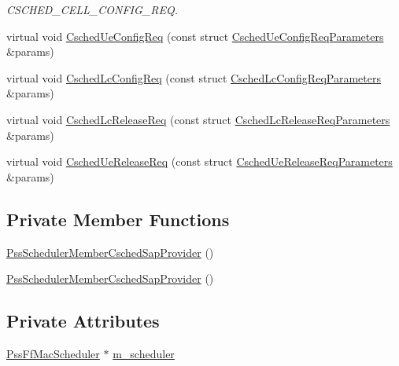 \begin{DoxyCompactItemize}
\begin{DoxyCompactList}\small\item\em C\+S\+C\+H\+E\+D\+\_\+\+C\+E\+L\+L\+\_\+\+C\+O\+N\+F\+I\+G\+\_\+\+R\+EQ. \end{DoxyCompactList}\item 
virtual void \hyperlink{classns3_1_1PssSchedulerMemberCschedSapProvider_a53a39ce3b42dffef27469d36454f8dfb}{Csched\+Ue\+Config\+Req} (const struct \hyperlink{structns3_1_1FfMacCschedSapProvider_1_1CschedUeConfigReqParameters}{Csched\+Ue\+Config\+Req\+Parameters} \&params)
\item 
virtual void \hyperlink{classns3_1_1PssSchedulerMemberCschedSapProvider_a5defa6a4e0f91494c09437b7ed276e87}{Csched\+Lc\+Config\+Req} (const struct \hyperlink{structns3_1_1FfMacCschedSapProvider_1_1CschedLcConfigReqParameters}{Csched\+Lc\+Config\+Req\+Parameters} \&params)
\item 
virtual void \hyperlink{classns3_1_1PssSchedulerMemberCschedSapProvider_a3a6b08c78c723482de224b869fb8c6e8}{Csched\+Lc\+Release\+Req} (const struct \hyperlink{structns3_1_1FfMacCschedSapProvider_1_1CschedLcReleaseReqParameters}{Csched\+Lc\+Release\+Req\+Parameters} \&params)
\item 
virtual void \hyperlink{classns3_1_1PssSchedulerMemberCschedSapProvider_aaef57062662f3d89227ab8a249e3a594}{Csched\+Ue\+Release\+Req} (const struct \hyperlink{structns3_1_1FfMacCschedSapProvider_1_1CschedUeReleaseReqParameters}{Csched\+Ue\+Release\+Req\+Parameters} \&params)
\end{DoxyCompactItemize}
\subsection*{Private Member Functions}
\begin{DoxyCompactItemize}
\item 
\hyperlink{classns3_1_1PssSchedulerMemberCschedSapProvider_ae9f5680c397e275f3700ff9fb5dc9312}{Pss\+Scheduler\+Member\+Csched\+Sap\+Provider} ()
\item 
\hyperlink{classns3_1_1PssSchedulerMemberCschedSapProvider_ae9f5680c397e275f3700ff9fb5dc9312}{Pss\+Scheduler\+Member\+Csched\+Sap\+Provider} ()
\end{DoxyCompactItemize}
\subsection*{Private Attributes}
\begin{DoxyCompactItemize}
\item 
\hyperlink{classns3_1_1PssFfMacScheduler}{Pss\+Ff\+Mac\+Scheduler} $\ast$ \hyperlink{classns3_1_1PssSchedulerMemberCschedSapProvider_a95ef8c69073a812b52b606aad81e54ef}{m\+\_\+scheduler}
\end{DoxyCompactItemize}


